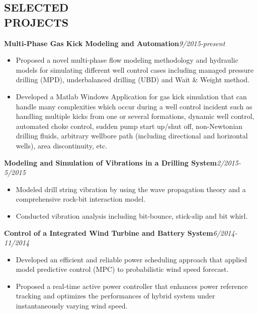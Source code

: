 \documentclass[margin, 9pt]{res} %
\begin{document}
\begin{resume}

\section{SELECTED\\ PROJECTS}
{\textbf{Multi-Phase Gas Kick Modeling and Automation}}\hfill\textit{9/2015-present}\\
\vspace*{-10pt}
\begin{itemize}[leftmargin=*] \itemsep -3pt
\vspace*{-5pt}
	\item Proposed a novel multi-phase flow modeling methodology and hydraulic models for simulating different well control cases including managed pressure drilling (MPD), underbalanced drilling (UBD) and Wait \& Weight method.
	\item Developed a Matlab Windows Application for gas kick simulation that can handle many complexities which occur during a well control incident such as handling multiple kicks from one or several formations, dynamic well control, automated choke control, sudden pump start up/shut off, non-Newtonian drilling fluids, arbitrary wellbore path (including directional and horizontal wells), area discontinuity, etc.
\end{itemize}

\medskip
{\textbf{Modeling and Simulation of Vibrations in a Drilling System}}\hfill\textit{2/2015-5/2015}\\
\vspace*{-10pt}
\begin{itemize}[leftmargin=*] \itemsep -3pt
\vspace*{-5pt}
	\item Modeled drill string vibration by using the wave propagation theory and a comprehensive rock-bit interaction model.
	\item Conducted vibration analysis including bit-bounce, stick-slip and bit whirl.
\end{itemize}

\medskip
{\textbf{Control of a Integrated Wind Turbine and Battery System}}\hfill\textit{6/2014-11/2014}\\
\vspace*{-10pt}
\begin{itemize}[leftmargin=*] \itemsep -3pt
\vspace*{-5pt}
	\item Developed an efficient and reliable power scheduling approach that applied model predictive control (MPC) to probabilistic wind speed forecast.
	\item Proposed a real-time active power controller that enhances power reference tracking and optimizes the performances of hybrid system under instantaneously varying wind speed.
\end{itemize}


\end{resume}
\end{document}
